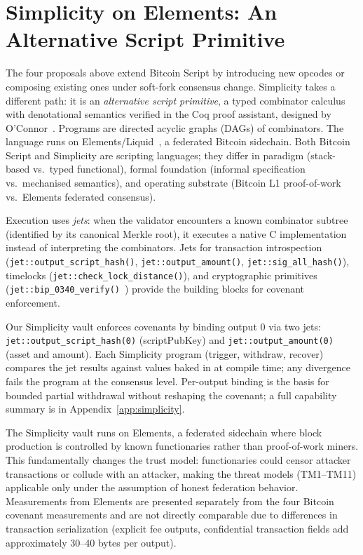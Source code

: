 \section{Simplicity on Elements: An Alternative Script Primitive} \label{se:simplicity_bg}

The four proposals above extend Bitcoin Script by introducing new
opcodes or composing existing ones under soft-fork consensus change.
Simplicity takes a different path: it is an \emph{alternative script
primitive}, a typed combinator calculus with denotational semantics
verified in the Coq proof assistant, designed by O'Connor~\cite{OC17}.
Programs are directed acyclic graphs (DAGs) of combinators. The
language runs on Elements/Liquid~\cite{DPNS16}, a federated Bitcoin
sidechain. Both Bitcoin Script and Simplicity are scripting languages;
they differ in paradigm (stack-based vs.\ typed functional), formal
foundation (informal specification vs.\ mechanised semantics), and
operating substrate (Bitcoin L1 proof-of-work vs.\ Elements federated
consensus).

Execution uses \emph{jets}: when the validator encounters a known combinator subtree
(identified by its canonical Merkle root), it executes a native C implementation instead
of interpreting the combinators. Jets for transaction introspection
(\texttt{jet::output\_script\_hash()}, \texttt{jet::output\_amount()},
\texttt{jet::sig\_all\_hash()}), timelocks (\texttt{jet::check\_lock\_distance()}), and
cryptographic primitives (\texttt{jet::bip\_0340\_verify()}~\cite{BIP340}) provide the
building blocks for covenant enforcement.

Our Simplicity vault enforces covenants by binding output 0 via two jets:
\texttt{jet::output\_script\_hash(0)} (scriptPubKey) and
\texttt{jet::output\_amount(0)} (asset and amount). Each Simplicity program
(trigger, withdraw, recover) compares the jet results against values baked in at
compile time; any divergence fails the program at the consensus level. Per-output
binding is the basis for bounded partial withdrawal without reshaping the covenant;
a full capability summary is in Appendix~\ref{app:simplicity}.

The Simplicity vault runs on Elements, a federated sidechain where block production is
controlled by known functionaries rather than proof-of-work miners. This fundamentally
changes the trust model: functionaries could censor attacker transactions or collude
with an attacker, making the threat models (TM1--TM11) applicable only under the
assumption of honest federation behavior. Measurements from Elements are presented
separately from the four Bitcoin covenant measurements and are not directly comparable
due to differences in transaction serialization (explicit fee outputs, confidential
transaction fields add approximately 30--40 bytes per output).


